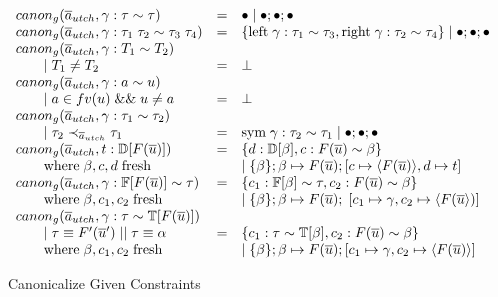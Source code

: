 \begin{figure}
\small
{}
\[
\begin{array}{l c l}
canon_g(\overline{a}_{utch}, \gamma : \tau \sim \tau) &=& \bullet \mid \bullet ; \bullet ; \bullet
\\
canon_g(\overline{a}_{utch}, \gamma : \tau_1 \; \tau_2 \sim \tau_3 \; \tau_4) &=& \{ \text{left} \;
\gamma : \tau_1 \sim \tau_3, \text{right} \; \gamma : \tau_2 \sim \tau_4\} \mid
\bullet ; \bullet ; \bullet
\\
canon_g(\overline{a}_{utch}, \gamma : T_1 \sim T_2)
\\ \qquad \mid T_1 \neq T_2 &=& \bot
\\
canon_g(\overline{a}_{utch}, \gamma : a \sim u)
\\
\qquad \mid a \in fv(u) \; \&\& \; u \neq a &=& \bot
\\
canon_g(\overline{a}_{utch}, \gamma : \tau_1 \sim \tau_2)
\\ \qquad \mid \tau_2 \prec_{\overline{a}_{utch}} \tau_1 &=& \text{sym} \; \gamma :
\tau_2 \sim \tau_1 \mid \bullet ; \bullet ; \bullet
\\
canon_g(\overline{a}_{utch}, t : \mathbb{D}[F(\overline{u})]) &=& \{ d : \mathbb{D}[\beta], c :
F(\overline{u}) \sim \beta\}
\\ \qquad \text{where} \; \beta, c, d \; \text{fresh} && \mid \{\beta\} ; \beta \mapsto F(\overline{u}) ; [c
\mapsto \langle F(\overline{u}) \rangle, d \mapsto t]
\\
canon_g(\overline{a}_{utch}, \gamma : \mathbb{F}[F(\overline{u})] \sim \tau) &=& \{ c_1 :
\mathbb{F}[\beta] \sim \tau, c_2 : F(\overline{u}) \sim \beta\}
\\ \qquad \text{where} \; \beta, c_1, c_2 \; \text{fresh} && \mid \{ \beta \} ; \beta \mapsto F(\overline{u}) ; \; [c_1 \mapsto \gamma,
c_2 \mapsto \langle F(\overline{u}  \rangle)]
\\
canon_g(\overline{a}_{utch}, \gamma : \tau \sim \mathbb{T}[F(\overline{u})])
\\ \qquad \mid \tau \equiv F'(\overline{u}') \; || \; \tau \equiv \alpha &=&
\{ c_1 : \tau \sim \mathbb{T}[\beta], c_2 : F(\overline{u}) \sim \beta\}
\\ \qquad \text{where} \; \beta, c_1, c_2 \; \text{fresh} && \mid \{\beta\} ; \beta \mapsto F(\overline{u}) ; [c_1 \mapsto \gamma, c_2
\mapsto \langle F(\overline{u}) \rangle]
\end{array}
\]
\caption{Canonicalize Given Constraints}
\label{fig:canon_g}
\end{figure}

